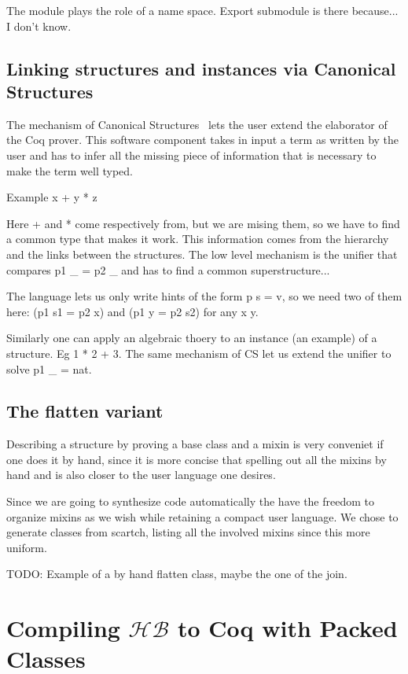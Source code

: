 \documentclass[a4paper,UKenglish,cleveref, autoref]{lipics-v2019}
\newcommand{\HB}{\ensuremath{\mathcal{HB}}}
\newcommand{\mixin}{mixin}
\newcommand{\mixins}{mixins}
\theoremstyle{implem}
\theoremstyle{implem}
\theoremstyle{axiom}
\theoremstyle{abscommand}
\theoremstyle{command}
\begin{document}
The module plays the role of a name space.
Export submodule is there because... I don't know.

\subsection{Linking structures and instances via Canonical Structures}

The mechanism of Canonical Structures~\cite{DBLP:conf/itp/MahboubiT13}
lets the user extend the elaborator of the Coq prover. This software component
takes in input a term as written by the user and has to infer all the missing
piece of information that is necessary to make the term well typed.

Example x + y * z

Here + and * come respectively from, but we are mising them, so we have
to find a common type that makes it work. This information comes from
the hierarchy and the links between the structures. The low level mechanism
is the unifier that compares p1 \_ = p2 \_ and has to find a common
superstructure...

The language lets us only write hints of the form p s = v, so we need two
of them here: (p1 s1 = p2 x) and (p1 y = p2 s2) for any x y.

Similarly one can apply an algebraic thoery to an instance (an example)
of a structure. Eg 1 * 2 + 3. The same mechanism of CS let us
extend the unifier to solve p1 \_ = nat.

\subsection{The flatten variant}

Describing a structure by proving a base class and a \mixin{} is very conveniet
if one does it by hand, since it is more concise that spelling out all the
\mixins{} by hand and is also closer to the user language one desires.

Since we are going to synthesize code automatically the have the freedom
to organize \mixins{} as we wish while retaining a compact user language.
We chose to generate classes from scartch, listing all the involved
\mixins{} since this more uniform.

TODO: Example of a by hand flatten class, maybe the one of the join.

\section{Compiling \HB{} to Coq with Packed Classes}\label{sec:compilation}
\end{document}
